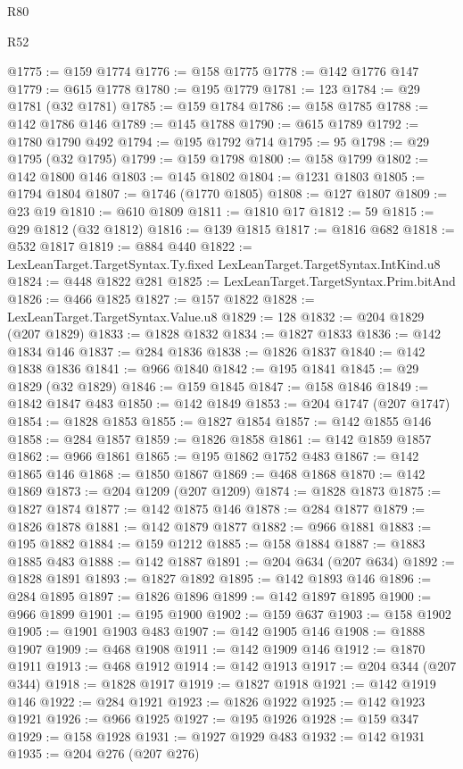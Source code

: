 \begin{lexlean}{R80}
\begin{lexlean}{R52}
\begin{coremodule}
{{{{{{{{{{{{{{{{{{{{{{{{{{{{{{{{{{{{{{{{{{{{{{{{{{{{{{{{{{{{{{{{{{{{{{{{{{{{{{{{{{{{{{{{{{{{{{{{{{{{{{{{{{{{{{{{{{{{{{{{{{{{{{{{{{{{{{{{{{{{{{{{{{{{{{{{{{{{{{{{{{{{{{{{{{{{{{{{{{{{{{{{{{{{{{{{{{{{{{@1775 := @159 @1774
@1776 := @158 @1775
@1778 := @142 @1776 @147
@1779 := @615 @1778
@1780 := @195 @1779
@1781 := 123
@1784 := @29 @1781 (@32 @1781)
@1785 := @159 @1784
@1786 := @158 @1785
@1788 := @142 @1786 @146
@1789 := @145 @1788
@1790 := @615 @1789
@1792 := @1780 @1790 @492
@1794 := @195 @1792 @714
@1795 := 95
@1798 := @29 @1795 (@32 @1795)
@1799 := @159 @1798
@1800 := @158 @1799
@1802 := @142 @1800 @146
@1803 := @145 @1802
@1804 := @1231 @1803
@1805 := @1794 @1804
@1807 := @1746 (@1770 @1805)
@1808 := @127 @1807
@1809 := @23 @19
@1810 := @610 @1809
@1811 := @1810 @17
@1812 := 59
@1815 := @29 @1812 (@32 @1812)
@1816 := @139 @1815
@1817 := @1816 @682
@1818 := @532 @1817
@1819 := @884 @440
@1822 := LexLeanTarget.TargetSyntax.Ty.fixed LexLeanTarget.TargetSyntax.IntKind.u8
@1824 := @448 @1822 @281
@1825 := LexLeanTarget.TargetSyntax.Prim.bitAnd
@1826 := @466 @1825
@1827 := @157 @1822
@1828 := LexLeanTarget.TargetSyntax.Value.u8
@1829 := 128
@1832 := @204 @1829 (@207 @1829)
@1833 := @1828 @1832
@1834 := @1827 @1833
@1836 := @142 @1834 @146
@1837 := @284 @1836
@1838 := @1826 @1837
@1840 := @142 @1838 @1836
@1841 := @966 @1840
@1842 := @195 @1841
@1845 := @29 @1829 (@32 @1829)
@1846 := @159 @1845
@1847 := @158 @1846
@1849 := @1842 @1847 @483
@1850 := @142 @1849
@1853 := @204 @1747 (@207 @1747)
@1854 := @1828 @1853
@1855 := @1827 @1854
@1857 := @142 @1855 @146
@1858 := @284 @1857
@1859 := @1826 @1858
@1861 := @142 @1859 @1857
@1862 := @966 @1861
@1865 := @195 @1862 @1752 @483
@1867 := @142 @1865 @146
@1868 := @1850 @1867
@1869 := @468 @1868
@1870 := @142 @1869
@1873 := @204 @1209 (@207 @1209)
@1874 := @1828 @1873
@1875 := @1827 @1874
@1877 := @142 @1875 @146
@1878 := @284 @1877
@1879 := @1826 @1878
@1881 := @142 @1879 @1877
@1882 := @966 @1881
@1883 := @195 @1882
@1884 := @159 @1212
@1885 := @158 @1884
@1887 := @1883 @1885 @483
@1888 := @142 @1887
@1891 := @204 @634 (@207 @634)
@1892 := @1828 @1891
@1893 := @1827 @1892
@1895 := @142 @1893 @146
@1896 := @284 @1895
@1897 := @1826 @1896
@1899 := @142 @1897 @1895
@1900 := @966 @1899
@1901 := @195 @1900
@1902 := @159 @637
@1903 := @158 @1902
@1905 := @1901 @1903 @483
@1907 := @142 @1905 @146
@1908 := @1888 @1907
@1909 := @468 @1908
@1911 := @142 @1909 @146
@1912 := @1870 @1911
@1913 := @468 @1912
@1914 := @142 @1913
@1917 := @204 @344 (@207 @344)
@1918 := @1828 @1917
@1919 := @1827 @1918
@1921 := @142 @1919 @146
@1922 := @284 @1921
@1923 := @1826 @1922
@1925 := @142 @1923 @1921
@1926 := @966 @1925
@1927 := @195 @1926
@1928 := @159 @347
@1929 := @158 @1928
@1931 := @1927 @1929 @483
@1932 := @142 @1931
@1935 := @204 @276 (@207 @276)
}}}}}}}}}}}}}}}}}}}}}}}}}}}}}}}}}}}}}}}}}}}}}}}}}}}}}}}}}}}}}}}}}}}}}}}}}}}}}}}}}}}}}}}}}}}}}}}}}}}}}}}}}}}}}}}}}}}}}}}}}}}}}}}}}}}}}}}}}}}}}}}}}}}}}}}}}}}}}}}}}}}}}}}}}}}}}}}}}}}}}}}}}}}}}}}}}}}}}}
\end{coremodule}
\end{lexlean}
\end{lexlean}
